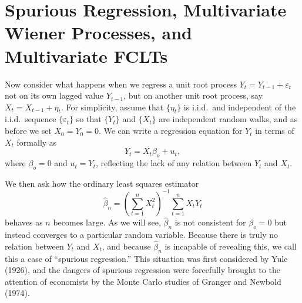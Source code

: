 \section{Spurious Regression, Multivariate Wiener Processes, and Multivariate FCLTs}\label{sec:spurious}

Now consider what happens when we regress a unit root process $Y_t = Y_{t-1} + \varepsilon_t$ not on its own lagged value $Y_{t-1}$, but on another unit root process, say $X_t = X_{t-1} + \eta_t$. For simplicity, assume that $\{\eta_t\}$ is i.i.d.\ and independent of the i.i.d.\ sequence $\{\varepsilon_t\}$ so that $\{Y_t\}$ and $\{X_t\}$ are independent random walks, and as before we set $X_0 = Y_0 = 0$. We can write a regression equation for $Y_t$ in terms of $X_t$ formally as
\[
Y_t = X_t \beta_o + u_t,
\]
where $\beta_o = 0$ and $u_t = Y_t$, reflecting the lack of any relation between $Y_t$ and $X_t$.

We then ask how the ordinary least squares estimator
\[
\hat{\beta}_n = \left(\sum_{t=1}^{n} X_t^2\right)^{-1}\sum_{t=1}^{n} X_t Y_t
\]
behaves as $n$ becomes large. As we will see, $\hat{\beta}_n$ is not consistent for $\beta_o = 0$ but instead converges to a particular random variable. Because there is truly no relation between $Y_t$ and $X_t$, and because $\hat{\beta}_n$ is incapable of revealing this, we call this a case of ``spurious regression.'' This situation was first considered by Yule (1926), and the dangers of spurious regression were forcefully brought to the attention of economists by the Monte Carlo studies of Granger and Newbold (1974).

